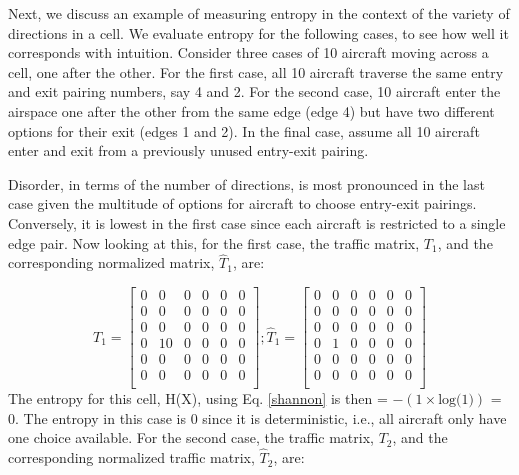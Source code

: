 \documentclass[conference, letter]{IEEEtran}
\begin{document}
Next, we discuss an example of measuring entropy in the context of the variety of directions in a cell. We evaluate entropy for the following cases, to see how well it corresponds with intuition. Consider three cases of 10 aircraft moving across a cell, one after the other. For the first case, all 10 aircraft traverse the same entry and exit pairing numbers, say 4 and 2. For the second case, 10 aircraft enter the airspace one after the other from the same edge (edge 4) but have two different options for their exit (edges 1 and 2). In the final case, assume all 10 aircraft enter and exit from a previously unused entry-exit pairing. 

Disorder, in terms of the number of directions, is most pronounced in the last case given the multitude of options for aircraft to choose entry-exit pairings. Conversely, it is lowest in the first case since each aircraft is restricted to a single edge pair. Now looking at this, for the first case, the traffic matrix, $T_1$, and the corresponding normalized matrix, $\hat{T}_1$, are: 

$$T_1 = \begin{bmatrix}
    0 & 0 & 0 & 0 & 0 & 0\\
    0 & 0 & 0 & 0 & 0 & 0\\
    0 & 0 & 0 & 0 & 0 & 0\\
    0 & 10 & 0 & 0 & 0 & 0\\
    0 & 0 & 0 & 0 & 0 & 0\\
    0 & 0 & 0 & 0 & 0 & 0\\
    \end{bmatrix};
\hat{T}_1 = \begin{bmatrix}
    0 & 0 & 0 & 0 & 0 & 0\\
    0 & 0 & 0 & 0 & 0 & 0\\
    0 & 0 & 0 & 0 & 0 & 0\\
    0 & 1 & 0 & 0 & 0 & 0\\
    0 & 0 & 0 & 0 & 0 & 0\\
    0 & 0 & 0 & 0 & 0 & 0\\
    \end{bmatrix}$$
The entropy for this cell, H(X), using Eq. \ref{shannon} is then  = $-(1\times \text{log(1)})$ = 0. The entropy in this case is 0 since it is deterministic, i.e., all aircraft only have one choice available. 
For the second case, the traffic matrix, $T_2$, and the corresponding normalized traffic matrix, $\hat{T}_2$, are:
\end{document}
